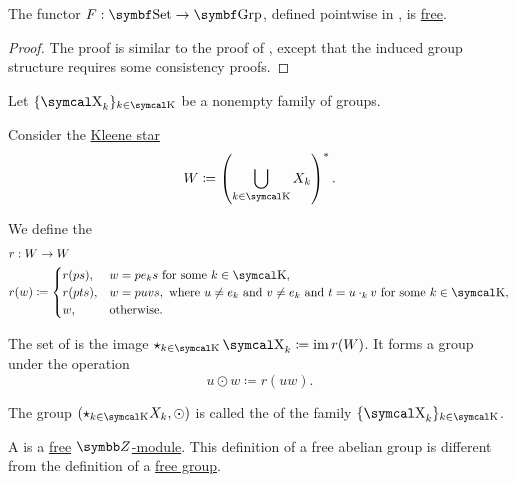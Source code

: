 \begin{proposition}\label{thm:free_group_is_free_functor}
  The functor \( F: \Cat{Set} \to \Cat{Grp} \), defined pointwise in , is \hyperref[def:free_functor]{free}.
\end{proposition}
\begin{proof}
  The proof is similar to the proof of , except that the induced group structure requires some consistency proofs.
\end{proof}

\begin{definition}\label{def:group_free_product}
  Let \( \{ \CX_k \}_{k \in \CK} \) be a nonempty family of groups.

  Consider the \hyperref[def:language/kleene_star]{Kleene star}
  \begin{equation*}
    W \coloneqq \left( \bigcup_{k \in \CK} X_k \right)^{\ast}.
  \end{equation*}

  We define the 
  \begin{align*}
    &r: W \to W \\
    &r(w) \coloneqq \begin{cases}
      r(ps),  & w = p e_k s \text{ for some } k \in \CK,                                                                              \\
      r(pts), & w = puvs, \text{ where } u \neq e_k \text{ and } v \neq e_k \text{ and } t = u \cdot_k v \text{ for some } k \in \CK, \\
      w,      & \text{otherwise}.
    \end{cases}
  \end{align*}

  The set of  is the image \( \star_{k \in \CK} \CX_k \coloneqq \Img r(W) \). It forms a group under the operation
  \begin{equation*}
    u \odot w \coloneqq r(uw).
  \end{equation*}

  The group \( (\star_{k \in \CK} X_k, \odot) \) is called the  of the family \( \{ \CX_k \}_{k \in \CK} \).
\end{definition}

\begin{definition}\label{def:free_abelian_group}
  A  is a \hyperref[def:free_left_module]{free} \hyperref[thm:abelian_group_iff_z_module]{\( \BZ \)-module}. This definition of a free abelian group is different from the definition of a \hyperref[def:free_group]{free group}.
\end{definition}

